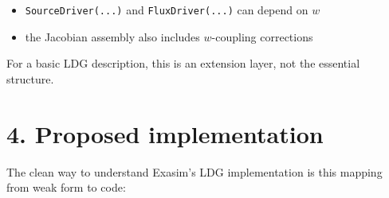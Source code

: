 \documentclass[11pt]{article}
\begin{document}
\begin{itemize}[leftmargin=*]
\item \texttt{SourceDriver(...)} and \texttt{FluxDriver(...)} can depend on $w$
\item the Jacobian assembly also includes $w$-coupling corrections
\end{itemize}

For a basic LDG description, this is an extension layer, not the essential
structure.

\section*{4. Proposed implementation}

The clean way to understand Exasim's LDG implementation is this mapping from
weak form to code:
\end{document}
